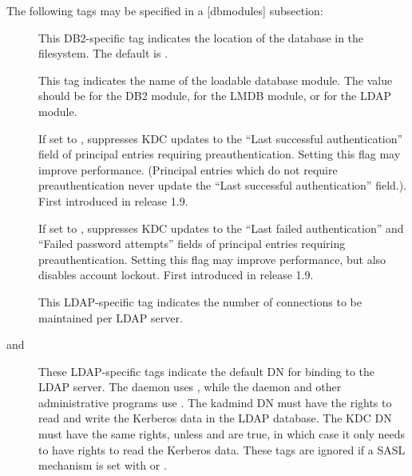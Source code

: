 \documentclass[letterpaper,10pt,english]{sphinxmanual}
\begin{document}
The following tags may be specified in a {[}dbmodules{]} subsection:
\begin{description}
\item[{}] \leavevmode
This DB2-specific tag indicates the location of the database in
the filesystem.  The default is {\hyperref[\detokenize{mitK5defaults:paths}]{}}.

\item[{}] \leavevmode
This tag indicates the name of the loadable database module.  The
value should be  for the DB2 module,  for the LMDB
module, or  for the LDAP module.

\item[{}] \leavevmode
If set to , suppresses KDC updates to the “Last successful
authentication” field of principal entries requiring
preauthentication.  Setting this flag may improve performance.
(Principal entries which do not require preauthentication never
update the “Last successful authentication” field.).  First
introduced in release 1.9.

\item[{}] \leavevmode
If set to , suppresses KDC updates to the “Last failed
authentication” and “Failed password attempts” fields of principal
entries requiring preauthentication.  Setting this flag may
improve performance, but also disables account lockout.  First
introduced in release 1.9.

\item[{}] \leavevmode
This LDAP-specific tag indicates the number of connections to be
maintained per LDAP server.

\item[{ and }] \leavevmode
These LDAP-specific tags indicate the default DN for binding to
the LDAP server.  The {\hyperref[\detokenize{admin/admin_commands/krb5kdc:krb5kdc-8}]{}} daemon uses
, while the {\hyperref[\detokenize{admin/admin_commands/kadmind:kadmind-8}]{}} daemon and other
administrative programs use .  The kadmind DN
must have the rights to read and write the Kerberos data in the
LDAP database.  The KDC DN must have the same rights, unless
 and  are true, in
which case it only needs to have rights to read the Kerberos data.
These tags are ignored if a SASL mechanism is set with
 or .


\end{description}
\end{document}

